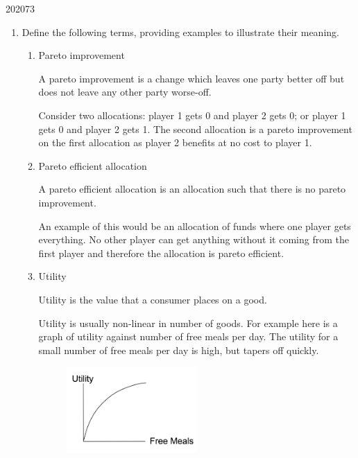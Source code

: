 \documentclass[a4paper]{article}
\begin{document}
\begin{examquestion}{2020}{7}{3}

\begin{enumerate}[label=(\alph*)]

\item Define the following terms, providing examples to illustrate their
meaning.

\begin{enumerate}[label=(\roman*)]

\item Pareto improvement

A pareto improvement is a change which leaves one party better off but does
not leave any other party worse-off.

Consider two allocations: player 1 gets 0 and player 2 gets 0; or player 1
gets 0 and player 2 gets 1. The second allocation is a pareto improvement on
the first allocation as player 2 benefits at no cost to player 1.

\item Pareto efficient allocation

A pareto efficient allocation is an allocation such that there is no pareto
improvement.

An example of this would be an allocation of funds where one
player gets everything. No other player can get anything without it coming
from the first player and therefore the allocation is pareto efficient.

\item Utility

Utility is the value that a consumer places on a good.

Utility is usually non-linear in number of goods. For example here is a
graph of utility against number of free meals per day. The utility for a
small number of free meals per day is high, but tapers off quickly.

\begin{figure}[H]
\centering
\includegraphics[width=0.5\textwidth]{./utility}
\end{figure}


\end{enumerate}
\end{enumerate}
\end{examquestion}
\end{document}
